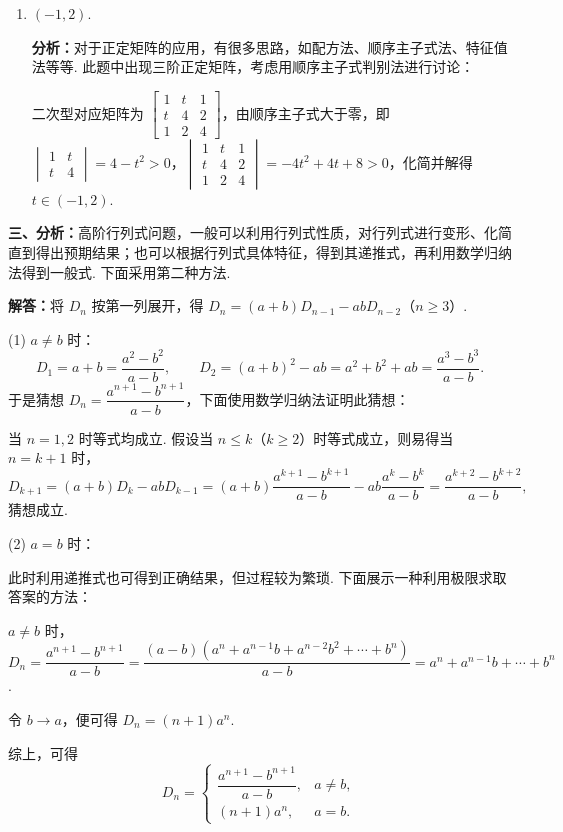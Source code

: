 \documentclass[a4paper,11pt]{ctexart}
\begin{document}
\begin{enumerate}[label=\arabic*., leftmargin=2em, itemsep=0.8em, topsep=0.5em]
  \item $(-1, 2)$.

  \textbf{分析：}对于正定矩阵的应用，有很多思路，如配方法、顺序主子式法、特征值法等等. 此题中出现三阶正定矩阵，考虑用顺序主子式判别法进行讨论：

  二次型对应矩阵为 $\begin{bmatrix} 1 & t & 1 \\ t & 4 & 2 \\ 1 & 2 & 4 \end{bmatrix}$，由顺序主子式大于零，即 $\begin{vmatrix} 1 & t \\ t & 4 \end{vmatrix} = 4 - t^2 > 0$，$\begin{vmatrix} 1 & t & 1 \\ t & 4 & 2 \\ 1 & 2 & 4 \end{vmatrix} = -4t^2 + 4t + 8 > 0$，化简并解得 $t \in (-1, 2)$.
\end{enumerate}

\vspace{0.8em}

\textbf{三、分析：}高阶行列式问题，一般可以利用行列式性质，对行列式进行变形、化简直到得出预期结果；也可以根据行列式具体特征，得到其递推式，再利用数学归纳法得到一般式. 下面采用第二种方法.

\textbf{解答：}将 $D_n$ 按第一列展开，得 $D_n = (a+b)D_{n-1} - ab D_{n-2}$（$n \geqslant 3$）.

(1) $a \neq b$ 时：
\[
  D_1 = a + b = \frac{a^2 - b^2}{a - b},\qquad D_2 = (a+b)^2 - ab = a^2 + b^2 + ab = \frac{a^3 - b^3}{a - b}.
\]
于是猜想 $D_n = \dfrac{a^{n+1} - b^{n+1}}{a - b}$，下面使用数学归纳法证明此猜想：

当 $n = 1, 2$ 时等式均成立. 假设当 $n \leqslant k$（$k \geqslant 2$）时等式成立，则易得当 $n = k + 1$ 时，
\[
  D_{k+1} = (a+b)D_k - ab D_{k-1}
  = (a+b)\frac{a^{k+1} - b^{k+1}}{a - b} - ab\frac{a^k - b^k}{a - b}
  = \frac{a^{k+2} - b^{k+2}}{a - b},
\]
猜想成立.

(2) $a = b$ 时：

此时利用递推式也可得到正确结果，但过程较为繁琐. 下面展示一种利用极限求取答案的方法：

$a \neq b$ 时，$D_n = \dfrac{a^{n+1} - b^{n+1}}{a - b} = \dfrac{(a-b)(a^n + a^{n-1}b + a^{n-2}b^2 + \cdots + b^n)}{a - b} = a^n + a^{n-1}b + \cdots + b^n$.

令 $b \to a$，便可得 $D_n = (n + 1)a^n$.

综上，可得
\[
  D_n = \begin{cases}
    \dfrac{a^{n+1} - b^{n+1}}{a - b}, & a \neq b, \\[0.8em]
    (n + 1)a^n, & a = b.
  \end{cases}
\]
\end{document}

